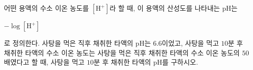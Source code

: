 어떤 용액의 수소 이온 농도를 $[\mathrm{H}^+]$라 할 때, 이 용액의 산성도를 나타내는 pH는 \par\smallskip\noindent\hspace*{1.5em}$-\log[\mathrm{H}^+]$\par\smallskip\noindent 로 정의한다. 사탕을 먹은 직후 채취한 타액의 pH는 $6.6$이었고, 사탕을 먹고 $10$분 후 채취한 타액의 수소 이온 농도는 사탕을 먹은 직후 채취한 타액의 수소 이온 농도의 $50$배였다고 할 때, 사탕을 먹고 $10$분 후 채취한 타액의 pH를 구하시오. 
